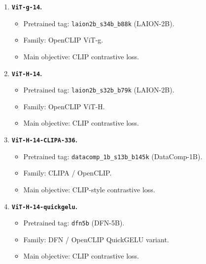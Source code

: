 \begin{enumerate}
    \item \textbf{\texttt{ViT-g-14}.}
        \begin{itemize}
            \item Pretrained tag: \texttt{laion2b\_s34b\_b88k} (LAION-2B).
            \item Family: OpenCLIP ViT-g.
            \item Main objective: CLIP contrastive loss.
        \end{itemize}

    \item \textbf{\texttt{ViT-H-14}.}
        \begin{itemize}
            \item Pretrained tag: \texttt{laion2b\_s32b\_b79k} (LAION-2B).
            \item Family: OpenCLIP ViT-H.
            \item Main objective: CLIP contrastive loss.
        \end{itemize}

    \item \textbf{\texttt{ViT-H-14-CLIPA-336}.}
        \begin{itemize}
            \item Pretrained tag: \texttt{datacomp\_1b\_s13b\_b145k} (DataComp-1B).
            \item Family: CLIPA / OpenCLIP.
            \item Main objective: CLIP-style contrastive loss.
        \end{itemize}

    \item \textbf{\texttt{ViT-H-14-quickgelu}.}
        \begin{itemize}
            \item Pretrained tag: \texttt{dfn5b} (DFN-5B).
            \item Family: DFN / OpenCLIP QuickGELU variant.
            \item Main objective: CLIP contrastive loss.
        \end{itemize}
\end{enumerate}

